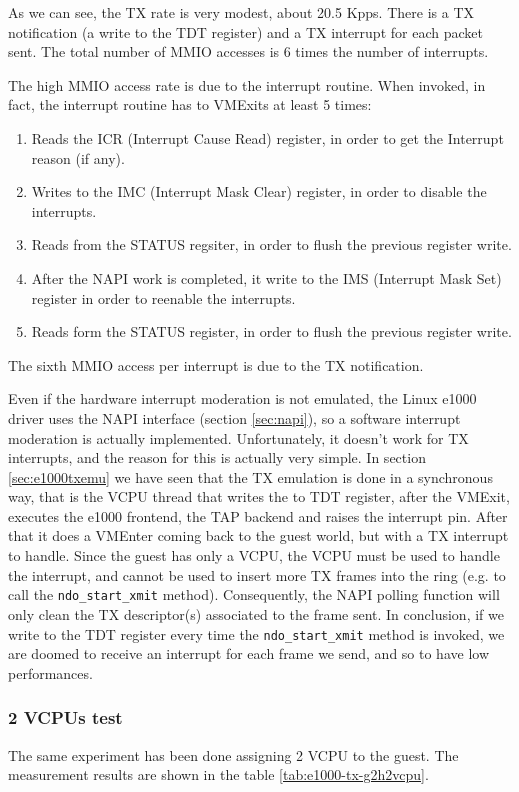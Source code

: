 As we can see, the TX rate is very modest, about 20.5 Kpps. There is a TX notification (a write to the TDT register) and a TX interrupt for 
each packet sent. The total number of MMIO accesses is 6 times the number of interrupts.

The high MMIO access rate is due to the interrupt routine. 
When invoked, in fact, the interrupt routine has to VMExits at least 5 times:
\begin{enumerate}
    \item Reads the ICR (Interrupt Cause Read) register, in order to get the Interrupt reason (if any).
    \item Writes to the IMC (Interrupt Mask Clear) register, in order to disable the interrupts.
    \item Reads from the STATUS regsiter, in order to flush the previous register write.
    \item After the NAPI work is completed, it write to the IMS (Interrupt Mask Set) register in order to reenable the interrupts.
    \item Reads form the STATUS register, in order to flush the previous register write.
\end{enumerate}

The sixth MMIO access per interrupt is due to the TX notification.

Even if the hardware interrupt moderation is not emulated, the Linux e1000 driver uses the NAPI interface (section \ref{sec:napi}), so 
a software interrupt
moderation is actually implemented. Unfortunately, it doesn't work for TX interrupts, and the reason for this is actually very simple.
In section \ref{sec:e1000txemu} we have seen that the TX emulation is done in a synchronous way, that is the VCPU thread that writes
the to TDT register, after the VMExit, executes the e1000 frontend, the TAP backend and raises the interrupt pin. After that
it does a VMEnter coming back to the guest world, but with a TX interrupt to handle. Since the guest
has only a VCPU, the VCPU must be used to handle the interrupt, and cannot be used to insert more TX frames into the ring (e.g. to call
the \texttt{ndo\_start\_xmit} method). Consequently, the NAPI polling function will only clean the TX descriptor(s) associated to the
frame sent.
In conclusion, if we write to the TDT register every time the \texttt{ndo\_start\_xmit} method is invoked, we are doomed to receive
an interrupt for each frame we send, and so to have low performances.


\subsubsection{2 VCPUs test}
The same experiment has been done assigning 2 VCPU to the guest. The measurement results are shown in the table \ref{tab:e1000-tx-g2h2vcpu}.

